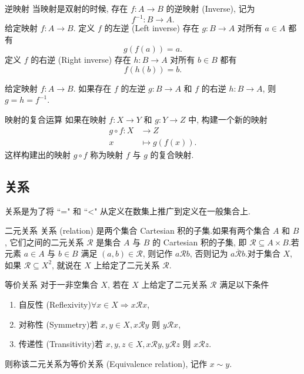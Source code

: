 \documentclass[cn,toc=twocol]{elegantbook}
\newcommand{\ITEMS}{\begin{enumerate}}
\newcommand{\ITEME}{\end{enumerate}}
\begin{document}
\begin{definition}{逆映射}
当映射是双射的时候, 存在 $f:A\rightarrow B$ 的逆映射 (Inverse), 记为
\[
	f^{-1}: B \rightarrow A.
\]
给定映射 $f : A \rightarrow B$. 定义 $f$ 的左逆 (Left inverse) 存在 $g : B \rightarrow A$ 对所有 $a \in A$ 都有
\[
	g(f(a)) = a.
\] 
定义 $f$ 的右逆 (Right inverse) 存在 $h: B \rightarrow A$ 对所有 $b\in B$ 都有 
\[
	f(h(b)) = b.
\]
\end{definition}

\begin{lemma}
	给定映射 $f : A \rightarrow B$. 如果存在 $f$ 的左逆 $g : B \rightarrow A$ 和 $f$ 的右逆 $h: B \rightarrow A$, 则 $g = h = f^{−1}$.
\end{lemma}

\begin{definition}{映射的复合运算}
如果在映射 $f:X\to Y$ 和 $g:Y\to Z$ 中, 构建一个新的映射
\[
\begin{aligned}
	g\circ f:X&\to Z\\
	x &\mapsto g(f(x)).
\end{aligned}
\]
这样构建出的映射 $g\circ f$ 称为映射 $f$ 与 $g$ 的复合映射.
\end{definition}

\subsection{关系}

关系是为了将 ``=" 和 ``<" 从定义在数集上推广到定义在一般集合上.

\begin{definition}{二元关系}
关系 (relation) 是两个集合 Cartesian 积的子集.如果有两个集合 $A$ 和 $B$, 它们之间的二元关系 $\mathcal{R}$ 是集合 $A$ 与 $B$ 的 Cartesian 积的子集, 即 $\mathcal{R} \subseteq A \times B$.若元素 $a \in A$ 与 $b \in B$ 满足 $(a,  b) \in \mathcal{R}$, 则记作 $a\mathcal{R}b$, 否则记为 $a\overline{\mathcal{R}}b$.对于集合 $X$, 如果 $\mathcal{R} \subseteq X^2$, 就说在 $X$ 上给定了二元关系 $\mathcal{R}$.
\end{definition}

\begin{definition}{等价关系}
对于一非空集合 $X$, 若在 $X$ 上给定了二元关系 $\mathcal{R}$ 满足以下条件
\ITEMS
	\item 自反性 (Reflexivity)\quad $\forall x\in X \Rightarrow x\mathcal{R}x$,
	\item 对称性 (Symmetry)\quad 若 $x, y\in X ,  x\mathcal{R}y$ 则 $y\mathcal{R}x$,
	\item 传递性 (Transitivity)\quad 若 $x, y, z\in X ,  x\mathcal{R}y,  y\mathcal{R}z$ 则 $x\mathcal{R}z$.
\ITEME 
则称该二元关系为等价关系 (Equivalence relation), 记作 $x\sim y$.
\end{definition}
\end{document}

